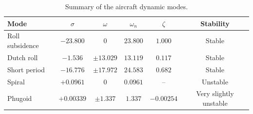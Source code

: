 \documentclass[11pt,a4paper]{article}
\begin{document}
\begin{table}[H]
\centering
\caption{Summary of the aircraft dynamic modes.}
\label{tab:mode_summary}
\begin{tabular}{lccccc}
\toprule
Mode & $\sigma$ & $\omega$ & $\omega_n$ & $\zeta$ & Stability \\
\midrule
Roll subsidence & $-23.800$ & $0$ & $23.800$ & $1.000$ & Stable \\
Dutch roll & $-1.536$ & $\pm13.029$ & $13.119$ & $0.117$ & Stable \\
Short period & $-16.776$ & $\pm17.972$ & $24.583$ & $0.682$ & Stable \\
Spiral & $+0.0961$ & $0$ & $0.0961$ & -- & Unstable \\
Phugoid & $+0.00339$ & $\pm1.337$ & $1.337$ & $-0.00254$ & Very slightly unstable \\
\bottomrule
\end{tabular}
\end{table}
\end{document}
